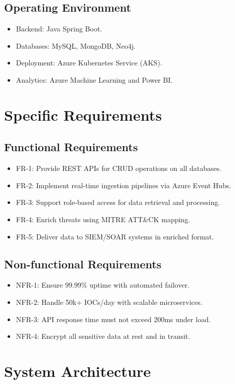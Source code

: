\documentclass[12pt]{article}
\begin{document}
\subsection{Operating Environment}
\begin{itemize}
    \item Backend: Java Spring Boot.
    \item Databases: MySQL, MongoDB, Neo4j.
    \item Deployment: Azure Kubernetes Service (AKS).
    \item Analytics: Azure Machine Learning and Power BI.
\end{itemize}

\section{Specific Requirements}
\subsection{Functional Requirements}
\begin{itemize}
    \item FR-1: Provide REST APIs for CRUD operations on all databases.
    \item FR-2: Implement real-time ingestion pipelines via Azure Event Hubs.
    \item FR-3: Support role-based access for data retrieval and processing.
    \item FR-4: Enrich threats using MITRE ATT&CK mapping.
    \item FR-5: Deliver data to SIEM/SOAR systems in enriched format.
\end{itemize}

\subsection{Non-functional Requirements}
\begin{itemize}
    \item NFR-1: Ensure 99.99\% uptime with automated failover.
    \item NFR-2: Handle 50k+ IOCs/day with scalable microservices.
    \item NFR-3: API response time must not exceed 200ms under load.
    \item NFR-4: Encrypt all sensitive data at rest and in transit.
\end{itemize}

\section{System Architecture}
\end{document}
